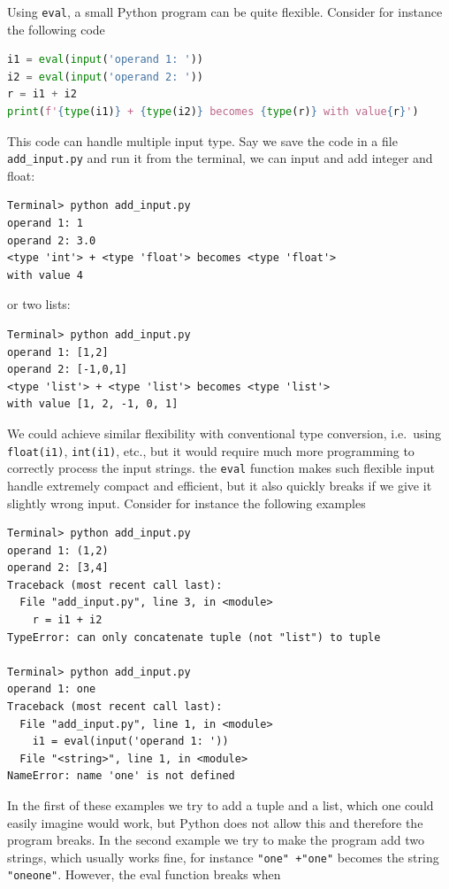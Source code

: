 \documentclass[graybox,envcountchap,sectrefs,final]{svmonodo}
\begin{document}
Using \texttt{eval}, a small Python program can be quite flexible. Consider for instance the following code
\begin{lstlisting}[language=Python,style=blue1]
i1 = eval(input('operand 1: '))
i2 = eval(input('operand 2: '))
r = i1 + i2
print(f'{type(i1)} + {type(i2)} becomes {type(r)} with value{r}')
\end{lstlisting}
This code can handle multiple input type. Say we save the code in a file \Verb!add_input.py! and run it from the terminal,
we can input and add integer and float:
\begin{Verbatim}[frame=lines,label=\fbox{{\tiny Terminal}},framesep=2.5mm,framerule=0.7pt]
Terminal> python add_input.py
operand 1: 1
operand 2: 3.0
<type 'int'> + <type 'float'> becomes <type 'float'>
with value 4
\end{Verbatim}
or two lists:
\begin{Verbatim}[frame=lines,label=\fbox{{\tiny Terminal}},framesep=2.5mm,framerule=0.7pt]
Terminal> python add_input.py
operand 1: [1,2]
operand 2: [-1,0,1]
<type 'list'> + <type 'list'> becomes <type 'list'>
with value [1, 2, -1, 0, 1]
\end{Verbatim}
We could achieve similar flexibility with conventional type conversion, i.e.~using \texttt{float(i1)}, \texttt{int(i1)}, etc., but it would
require much more programming to correctly process the input strings. the \texttt{eval} function makes such flexible input handle
extremely compact and efficient, but it also quickly breaks if we give it slightly wrong input. Consider for instance
the following examples
\begin{Verbatim}[frame=lines,label=\fbox{{\tiny Terminal}},framesep=2.5mm,framerule=0.7pt]
Terminal> python add_input.py
operand 1: (1,2)
operand 2: [3,4]
Traceback (most recent call last):
  File "add_input.py", line 3, in <module>
    r = i1 + i2
TypeError: can only concatenate tuple (not "list") to tuple

Terminal> python add_input.py
operand 1: one
Traceback (most recent call last):
  File "add_input.py", line 1, in <module>
    i1 = eval(input('operand 1: '))
  File "<string>", line 1, in <module>
NameError: name 'one' is not defined
\end{Verbatim}
In the first of these examples we try to add a tuple and a list, which one could easily imagine would work, but Python
does not allow this and therefore the program breaks. In the second example we try to make the program add two strings,
which usually works fine, for instance \texttt{"one" +"one"} becomes the string \texttt{"oneone"}. However, the eval function breaks when
\end{document}
